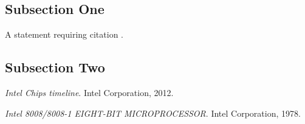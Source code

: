 \documentclass[twoside,twocolumn]{article}
\begin{document}
\subsection{Subsection One}

A statement requiring citation \cite{Figueredo:2009dg}.
\blindtext %

\subsection{Subsection Two}

\blindtext %


\begin{thebibliography}{99} %

\textit{Intel Chips timeline}.
Intel Corporation, 2012.

\textit{Intel 8008/8008-1 EIGHT-BIT MICROPROCESSOR}.
Intel Corporation, 1978.

\end{thebibliography}

\end{document}
